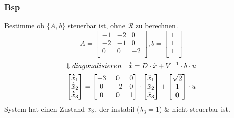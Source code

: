         \subsubsection{Bsp}
            Bestimme ob $\{A,b\}$ steuerbar ist, ohne $\mathcal{R}$ zu berechnen.
            \[ A=
            \begin{bmatrix}
            -1  &   -2  &   0\\
            -2  &  -1  &   0\\
            0   &   0   &   -2\\
            \end{bmatrix},
            b=
            \begin{bmatrix}
            1\\ 1\\ 1\\
            \end{bmatrix}
            \]
            \[\Downarrow diagonalisieren\quad \dot{\Tilde{x}}=D\cdot\Tilde{x}+V^{-1}\cdot b\cdot u\]
            \[
            \begin{bmatrix}
                \dot{\Tilde{x}}_1\\
                \dot{\Tilde{x}}_2\\
                \dot{\Tilde{x}}_3\\
            \end{bmatrix}
            =
            \begin{bmatrix}
            -3  &   0   &   0\\
            0   &   -2  &   0\\
            0   &   0   &   1\\
            \end{bmatrix}
            \cdot
            \begin{bmatrix}
                \Tilde{x}_1\\
                \Tilde{x}_2\\
                \Tilde{x}_3\\
            \end{bmatrix}
            +
            \begin{bmatrix}
            \sqrt{2}\\
            1\\
            0\\
            \end{bmatrix}
            \cdot
            u
            \]
            System hat einen Zustand $\Tilde{x}_3$, der instabil ($\lambda_3=1$) \& nicht steuerbar ist.
